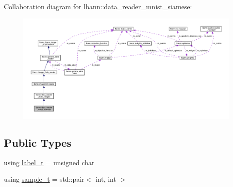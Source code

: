 Collaboration diagram for lbann\+:\+:data\+\_\+reader\+\_\+mnist\+\_\+siamese\+:\nopagebreak
\begin{figure}[H]
\begin{center}
\leavevmode
\includegraphics[width=350pt]{classlbann_1_1data__reader__mnist__siamese__coll__graph}
\end{center}
\end{figure}
\subsection*{Public Types}
\begin{DoxyCompactItemize}
\item 
using \hyperlink{classlbann_1_1data__reader__mnist__siamese_abc3253e1de3910bef9e317ef5a396a47}{label\+\_\+t} = unsigned char
\item 
using \hyperlink{classlbann_1_1data__reader__mnist__siamese_af159922f68098bfcb16a9df46d501103}{sample\+\_\+t} = std\+::pair$<$ int, int $>$
\end{DoxyCompactItemize}
